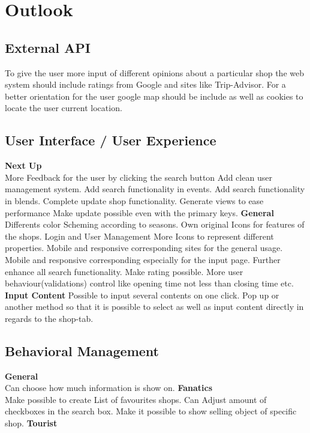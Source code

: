 \section{Outlook}

\subsection{External API}
To give the user more input of different opinions about a particular shop the web system should include ratings from Google and sites like Trip-Advisor.
For a better orientation for the user google map should be include as well as cookies to locate the user current location.
\subsection{User Interface / User Experience}
\textbf{Next Up}\\
More Feedback for the user by clicking the search button
Add clean user management system.
Add search functionality in events.
Add search functionality in blends.
Complete update shop functionality.
Generate views to ease performance
Make update possible even with the primary keys.
\textbf{General}\\
Differents color Scheming according to seasons.
Own original Icons for features of the shops.
Login and User Management
More Icons to represent different properties.
Mobile and responsive corresponding sites for the general usage.
Mobile and responsive corresponding especially for the input page.
Further enhance all search functionality.
Make rating possible.
More user behaviour(validations) control like opening time not less than closing time etc.
\textbf{Input Content}
Possible to input several contents on one click.
Pop up or another  method so that it is possible to select as well as input content directly in regards to the shop-tab.

\subsection{Behavioral Management}
\textbf{General}\\
Can choose how much information is show on. 
\textbf{Fanatics}\\
Make possible to create List of favourites shops.
Can Adjust amount of checkboxes in the search box.
Make it possible to show selling object of specific shop. 
\textbf{Tourist}\\

